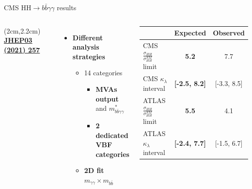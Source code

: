 \begin{frame}{CMS HH$\to b\bar{b}\gamma\gamma$ results}

\begin{columns}

\begin{textblock*}{5cm}(2cm,2.2cm) %
   \textcolor{HHred}{\textbf{\href{https://doi.org/10.1007/JHEP03(2021)257}{ JHEP03 (2021) 257}}}
\end{textblock*}

\begin{itemize}

    \item \textbf{\textcolor{structurColor}{Different analysis strategies}}
    \begin{itemize}
        \item 14 categories
        \begin{itemize}
            \item \textbf{MVAs output} and \textbf{$m_{b\bar{b}\gamma\gamma}^{*}$}
            \item \textbf{2 dedicated VBF categories} 
        \end{itemize}
        \item \textcolor{HHturquoise_d}{\textbf{2D fit}} $m_{\gamma\gamma}\times m_{b\bar{b}}$
    \end{itemize}
\end{itemize}


\begin{table}[]
    \centering
    \begin{tabular}{lcc}
    \hline\hline
    & Expected & Observed \\
    \hline 
    CMS $\frac{\sigma_{HH}}{\sigma_{HH}^{SM}}$ limit & \textbf{5.2} & 7.7 \\
    CMS $\kappa_{\lambda}$ interval & \textbf{[-2.5, 8.2]} & [-3.3, 8.5] \\
    \hline 
    ATLAS $\frac{\sigma_{HH}}{\sigma_{HH}^{SM}}$ limit & \textbf{5.5} & 4.1 \\
    ATLAS $\kappa_{\lambda}$ interval & \textcolor{HHred}{\textbf{[-2.4, 7.7]}} & [-1.5, 6.7] \\ 
    \hline\hline
    \end{tabular}
    
\end{table}

\end{columns}
\end{frame}

